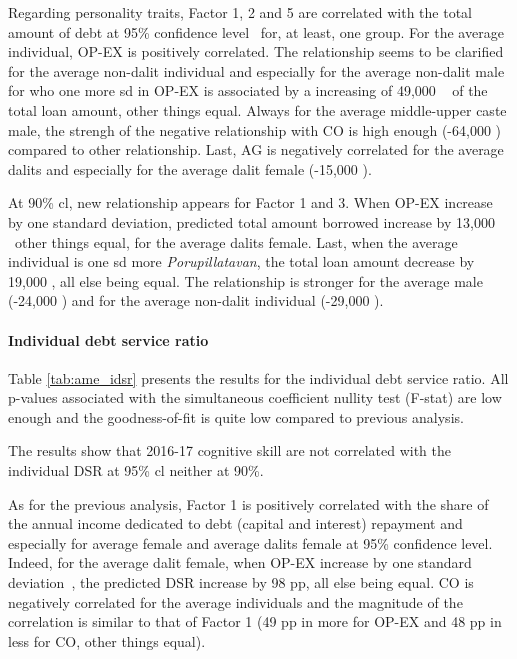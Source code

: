 \documentclass[a4paper, 11pt, onecolumn]{article}
\newcommand{\sd}{standard deviation}
\newcommand{\aebe}{all else being equal}
\newcommand{\ote}{other things equal}
\newcommand{\cl}{confidence level}
\newcommand{\PTCS}{PT\&CS}
\begin{document}
Regarding personality traits, Factor 1, 2 and 5 are correlated with the total amount of debt at 95\% \cl~ for, at least, one group.
For the average individual, OP-EX is positively correlated.
The relationship seems to be clarified for the average non-dalit individual and especially for the average non-dalit male for who one more sd in OP-EX is associated by a increasing of 49,000 \rupee~ of the total loan amount, \ote.
Always for the average middle-upper caste male, the strengh of the negative relationship with CO is high enough (-64,000 \rupee) compared to other relationship. 
Last, AG is negatively correlated for the average dalits and especially for the average dalit female (-15,000 \rupee).

At 90\% cl, new relationship appears for Factor 1 and 3.
When OP-EX increase by one \sd, predicted total amount borrowed increase by 13,000 \rupee~\ote, for the average dalits female.
Last, when the average individual is one sd more \textit{Porupillatavan}, the total loan amount decrease by 19,000 \rupee, \aebe.
The relationship is stronger for the average male (-24,000 \rupee) and for the average non-dalit individual (-29,000 \rupee).
 



\paragraph{Individual debt service ratio}
Table \ref{tab:ame_idsr} presents the results for the individual debt service ratio.
All p-values associated with the simultaneous coefficient nullity test (F-stat) are low enough and the goodness-of-fit is quite low compared to previous analysis.

The results show that 2016-17 cognitive skill are not correlated with the individual DSR at 95\% cl neither at 90\%.

As for the previous analysis, Factor 1 is positively correlated with the share of the annual income dedicated to debt (capital and interest) repayment and especially for average female and average dalits female at 95\% \cl.
Indeed, for the average dalit female, when OP-EX increase by one \sd~, the predicted DSR increase by 98 pp, \aebe.
CO is negatively correlated for the average individuals and the magnitude of the correlation is similar to that of Factor 1 (49 pp in more for OP-EX and 48 pp in less for CO, \ote).
\end{document}
